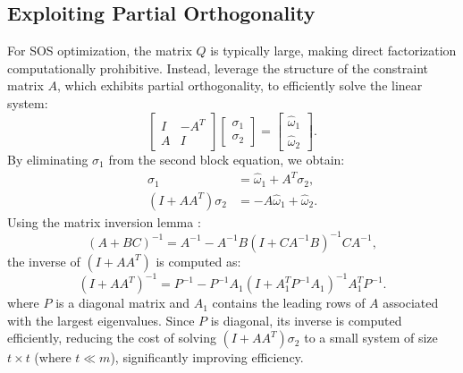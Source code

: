 \documentclass[12pt]{l4dc2021}
\begin{document}
    \subsection{Exploiting Partial Orthogonality}
        For SOS optimization, the matrix \( Q \) is typically large, making direct factorization computationally prohibitive. Instead, \cite{zheng2018fast} leverage the structure of the constraint matrix \( A \), which exhibits partial orthogonality, to efficiently solve the linear system:
        \begin{equation}
            \begin{bmatrix} I & -A^T \\ A & I \end{bmatrix} \begin{bmatrix} \sigma_1 \\ \sigma_2 \end{bmatrix} =
            \begin{bmatrix} \hat{\omega}_1 \\ \hat{\omega}_2 \end{bmatrix}.
        \end{equation}
        By eliminating \( \sigma_1 \) from the second block equation, we obtain:
        \begin{align}
            \sigma_1 &= \hat{\omega}_1 + A^T \sigma_2, \\
            (I + A A^T) \sigma_2 &= -A \hat{\omega}_1 + \hat{\omega}_2.
        \end{align}
        Using the matrix inversion lemma :
        \begin{equation}
            (A + BC)^{-1} = A^{-1} - A^{-1}B (I + CA^{-1}B)^{-1} CA^{-1},
        \end{equation}
        the inverse of \( (I + A A^T) \) is computed as:
        \begin{equation}
            (I + A A^T)^{-1} = P^{-1} - P^{-1} A_1 (I + A_1^T P^{-1} A_1)^{-1} A_1^T P^{-1}. 
        \end{equation}
        where \( P \) is a diagonal matrix and \( A_1 \) contains the leading rows of \( A \) associated with the largest eigenvalues. Since \( P \) is diagonal, its inverse is computed efficiently, reducing the cost of solving \( (I + A A^T) \sigma_2 \) to a small system of size \( t \times t \) (where \( t \ll m \)), significantly improving efficiency.
    
\end{document}
